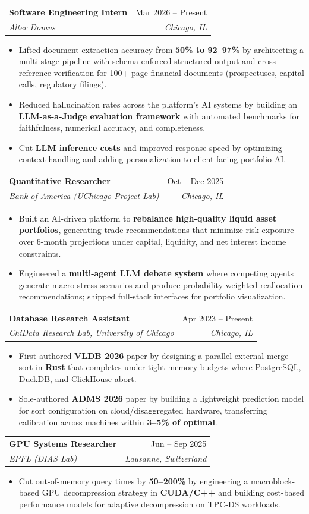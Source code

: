 \documentclass[letterpaper,10pt]{article}
\makeatletter
\newcommand{\resumeItem}[1]{
  \item\small{
    {#1 \vspace{-3pt}}
  }
}
\newcommand{\resumeSubheading}[4]{
  \item
    \begin{tabular*}{0.99\textwidth}[t]{l@{\extracolsep{\fill}}r}
      \textbf{#1} & #2 \\
      \textit{\small#3} & \textit{\small #4} \\
    \end{tabular*}\vspace{-8pt}
}
\newcommand{\resumeItemListStart}{\begin{itemize}[leftmargin=0.15in]}
\newcommand{\resumeItemListEnd}{\end{itemize}\vspace{-7pt}}
\makeatother
\begin{document}
    \resumeSubheading
      {Software Engineering Intern}{Mar 2026 -- Present}
      {Alter Domus}{Chicago, IL}
      \resumeItemListStart
        \resumeItem{Lifted document extraction accuracy from \textbf{50\% to 92--97\%} by architecting a multi-stage pipeline with schema-enforced structured output and cross-reference verification for 100+ page financial documents (prospectuses, capital calls, regulatory filings).}
        \resumeItem{Reduced hallucination rates across the platform's AI systems by building an \textbf{LLM-as-a-Judge evaluation framework} with automated benchmarks for faithfulness, numerical accuracy, and completeness.}
        \resumeItem{Cut \textbf{LLM inference costs} and improved response speed by optimizing context handling and adding personalization to client-facing portfolio AI.}
      \resumeItemListEnd

    \resumeSubheading
      {Quantitative Researcher}{Oct -- Dec 2025}
      {Bank of America (UChicago Project Lab)}{Chicago, IL}
      \resumeItemListStart
        \resumeItem{Built an AI-driven platform to \textbf{rebalance high-quality liquid asset portfolios}, generating trade recommendations that minimize risk exposure over 6-month projections under capital, liquidity, and net interest income constraints.}
        \resumeItem{Engineered a \textbf{multi-agent LLM debate system} where competing agents generate macro stress scenarios and produce probability-weighted reallocation recommendations; shipped full-stack interfaces for portfolio visualization.}
      \resumeItemListEnd

    \resumeSubheading
      {Database Research Assistant}{Apr 2023 -- Present}
      {ChiData Research Lab, University of Chicago}{Chicago, IL}
      \resumeItemListStart
        \resumeItem{First-authored \textbf{VLDB 2026} paper by designing a parallel external merge sort in \textbf{Rust} that completes under tight memory budgets where PostgreSQL, DuckDB, and ClickHouse abort.}
        \resumeItem{Sole-authored \textbf{ADMS 2026} paper by building a lightweight prediction model for sort configuration on cloud/disaggregated hardware, transferring calibration across machines within \textbf{3--5\% of optimal}.}
      \resumeItemListEnd

    \resumeSubheading
      {GPU Systems Researcher}{Jun -- Sep 2025}
      {EPFL (DIAS Lab)}{Lausanne, Switzerland}
      \resumeItemListStart
        \resumeItem{Cut out-of-memory query times by \textbf{50--200\%} by engineering a macroblock-based GPU decompression strategy in \textbf{CUDA/C++} and building cost-based performance models for adaptive decompression on TPC-DS workloads.}
      \resumeItemListEnd
\end{document}
